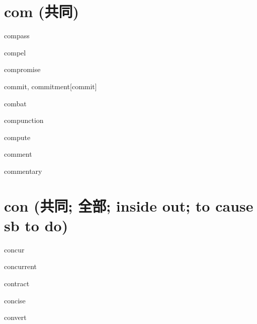 \section{com (共同)}

\begin{RefWord}{compass}
\end{RefWord}

\begin{RefWord}{compel}
\end{RefWord}

\begin{RefWord}{compromise}
\end{RefWord}

\begin{RefWord}{commit, commitment}[commit]
\end{RefWord}

\begin{RefWord}{combat}
\end{RefWord}

\begin{RefWord}{compunction}
\end{RefWord}

\begin{RefWord}{compute}
\end{RefWord}

\begin{RefWord}{comment}
\end{RefWord}

\begin{RefWord}{commentary}
\end{RefWord}

\section{con (共同; 全部; inside out; to cause sb to do)}
\begin{RefWord}{concur}
\end{RefWord}

\begin{RefWord}{concurrent}
\end{RefWord}

\begin{RefWord}{contract}
\end{RefWord}

\begin{RefWord}{concise}
\end{RefWord}

\begin{RefWord}{convert}
\end{RefWord}

